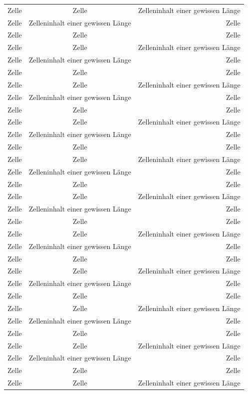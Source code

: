 \documentclass[ngerman]{scrartcl}
\begin{document}
\begin{longtabu}[l]{@{}lcr@{}}
		Zelle & Zelle & Zelleninhalt einer gewissen Länge\\
		Zelle & Zelleninhalt einer gewissen Länge & Zelle\\
		Zelle & Zelle & Zelle\\
		Zelle & Zelle & Zelleninhalt einer gewissen Länge\\
		Zelle & Zelleninhalt einer gewissen Länge & Zelle\\
		Zelle & Zelle & Zelle\\
		Zelle & Zelle & Zelleninhalt einer gewissen Länge\\
		Zelle & Zelleninhalt einer gewissen Länge & Zelle\\
		Zelle & Zelle & Zelle\\
		Zelle & Zelle & Zelleninhalt einer gewissen Länge\\
		Zelle & Zelleninhalt einer gewissen Länge & Zelle\\
		Zelle & Zelle & Zelle\\
		Zelle & Zelle & Zelleninhalt einer gewissen Länge\\
		Zelle & Zelleninhalt einer gewissen Länge & Zelle\\
		Zelle & Zelle & Zelle\\
		Zelle & Zelle & Zelleninhalt einer gewissen Länge\\
		Zelle & Zelleninhalt einer gewissen Länge & Zelle\\
		Zelle & Zelle & Zelle\\
		Zelle & Zelle & Zelleninhalt einer gewissen Länge\\
		Zelle & Zelleninhalt einer gewissen Länge & Zelle\\
		Zelle & Zelle & Zelle\\
		Zelle & Zelle & Zelleninhalt einer gewissen Länge\\
		Zelle & Zelleninhalt einer gewissen Länge & Zelle\\
		Zelle & Zelle & Zelle\\
		Zelle & Zelle & Zelleninhalt einer gewissen Länge\\
		Zelle & Zelleninhalt einer gewissen Länge & Zelle\\
		Zelle & Zelle & Zelle\\
		Zelle & Zelle & Zelleninhalt einer gewissen Länge\\
		Zelle & Zelleninhalt einer gewissen Länge & Zelle\\
		Zelle & Zelle & Zelle\\
		Zelle & Zelle & Zelleninhalt einer gewissen Länge\\

\end{longtabu}
\end{document}
